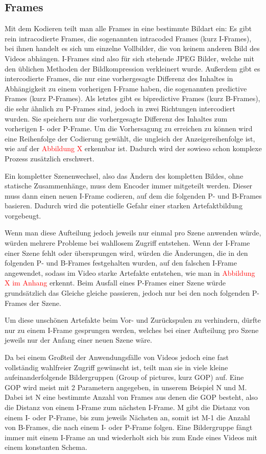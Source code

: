 \subsection{Frames}
Mit dem Kodieren teilt man alle Frames in eine bestimmte Bildart ein:
Es gibt rein intracodierte Frames, die sogenannten intracoded Frames (kurz I-Frames), bei ihnen handelt es sich um einzelne Vollbilder, die von keinem anderen Bild des Videos abhängen. I-Frames sind also für sich stehende JPEG Bilder, welche mit den üblichen Methoden der Bildkompression verkleinert wurde.
Außerdem gibt es intercodierte Frames, die nur eine vorhergesagte Differenz des Inhaltes in Abhängigkeit zu einem vorherigen I-Frame haben, die sogenannten predictive Frames (kurz P-Frames).
Als letztes gibt es bipredictive Frames (kurz B-Frames), die sehr ähnlich zu P-Frames sind, jedoch in zwei Richtungen intercodiert wurden. Sie speichern nur die vorhergesagte Differenz des Inhaltes zum vorherigen I- oder P-Frame.
Um die Vorhersagung zu erreichen zu können wird eine Reihenfolge der Codierung gewählt, die ungleich der Anzeigereihenfolge ist, wie auf der \textcolor{red}{Abbildung X} erkennbar ist. Dadurch wird der sowieso schon komplexe Prozess zusätzlich erschwert.

Ein kompletter Szenenwechsel, also das Ändern des kompletten Bildes, ohne statische Zusammenhänge, muss dem Encoder immer mitgeteilt werden. Dieser muss dann einen neuen I-Frame codieren, auf dem die folgenden P- und B-Frames basieren. Dadurch wird die potentielle Gefahr einer starken Artefaktbildung vorgebeugt.

Wenn man diese Aufteilung jedoch jeweils nur einmal pro Szene anwenden würde, würden mehrere Probleme bei wahllosem Zugriff entstehen. Wenn der I-Frame einer Szene fehlt oder übersprungen wird, würden die Änderungen, die in den folgenden P- und B-Frames festgehalten wurden, auf den falschen I-Frame angewendet, sodass im Video starke Artefakte entstehen, wie man in \textcolor{red}{Abbildung X im Anhang} erkennt. Beim Ausfall eines P-Frames einer Szene würde grundsätzlich das Gleiche gleiche passieren, jedoch nur bei den noch folgenden P-Frames der Szene.

Um diese unschönen Artefakte beim Vor- und Zurückspulen zu verhindern, dürfte nur zu einem I-Frame gesprungen werden, welches bei einer Aufteilung pro Szene jeweils nur der Anfang einer neuen Szene wäre.

Da bei einem Großteil der Anwendungsfälle von Videos jedoch eine fast vollständig wahlfreier Zugriff gewünscht ist, teilt man sie in viele kleine aufeinanderfolgende Bildergruppen (Group of pictures, kurz GOP) auf. Eine GOP wird meist mit 2 Parametern angegeben, in unserem Beispiel N und M.
Dabei ist N eine bestimmte Anzahl von Frames aus denen die GOP besteht, also die Distanz von einem I-Frame zum nächsten I-Frame.
M gibt die Distanz von einem I- oder P-Frame, bis zum jeweils Nächsten an, somit ist M-1 die Anzahl von B-Frames, die nach einem I- oder P-Frame folgen. Eine Bildergruppe fängt immer mit einem I-Frame an und wiederholt sich bis zum Ende eines Videos mit einem konstanten Schema.

